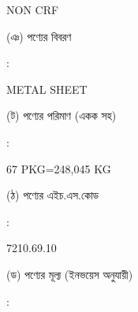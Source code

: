 \documentclass[12pt]{article}
\newcommand{\good}{METAL SHEET}
\newcommand{\pkg}{67 PKG=248,045 KG}
\newcommand{\hscode}{7210.69.10}
\newcommand{\crf}{NON CRF}
\newcommand{\crfdt}{}
\begin{document}
\begin{minipage}[t]{0.53\linewidth}
{\crf} \hspace{2em} {\crfdt}
\\
\end{minipage}
\begin{minipage}[t]{0.05\linewidth}
\hspace*{1em}
\end{minipage}
\begin{minipage}[t]{0.40\linewidth}
(ঞ) পণ্যের বিবরণ
\end{minipage}
\begin{minipage}[t]{0.02\linewidth}
:
\end{minipage}
\begin{minipage}[t]{0.53\linewidth}
{\good}
\\
\end{minipage}
\begin{minipage}[t]{0.05\linewidth}
\hspace*{1em}
\end{minipage}
\begin{minipage}[t]{0.40\linewidth}
(ট) পণ্যের পরিমাণ (একক সহ)
\end{minipage}
\begin{minipage}[t]{0.02\linewidth}
:
\end{minipage}
\begin{minipage}[t]{0.53\linewidth}
{\pkg}
\\
\end{minipage}
\begin{minipage}[t]{0.05\linewidth}
\hspace*{1em}
\end{minipage}
\begin{minipage}[t]{0.40\linewidth}
(ঠ) পণ্যের এইচ.এস.কোড
\end{minipage}
\begin{minipage}[t]{0.02\linewidth}
:
\end{minipage}
\begin{minipage}[t]{0.53\linewidth}
{\hscode}
\\
\end{minipage}
\begin{minipage}[t]{0.05\linewidth}
\hspace*{1em}
\end{minipage}
\begin{minipage}[t]{0.40\linewidth}
(ড) পণ্যের মূল্য (ইনভয়েস অনুযায়ী)
\end{minipage}
\begin{minipage}[t]{0.02\linewidth}
:
\end{minipage}
\end{document}
